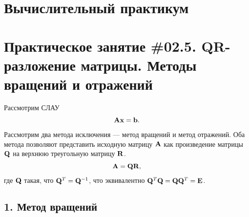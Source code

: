 \documentclass[12pt]{article}
\begin{document}
    \begin{flushright}
    \end{flushright}
    \begin{flushright}
    \end{flushright}
    \section*{Вычислительный практикум}
    \section*{Практическое занятие \#02.5. QR-разложение матрицы. Методы вращений и отражений}
	
	Рассмотрим СЛАУ
	\begin{equation}
		\bold{Ax}=\bold{b}.\label{fm0}
	\end{equation}
	Рассмотрим два метода исключения --- метод вращений и метод отражений. Оба метода позволяют представить исходную матрицу $\bold A$ как произведение матрицы $\bold Q$ на верхнюю треугольную матрицу $\bold R$.
	\begin{equation}
		\bold{A}=\bold{QR},
	\end{equation}
	где $\bold{Q}$ такая, что $\bold{Q}^{T}=\bold{Q}^{-1}$, что эквивалентно $\bold{Q}^T \bold{Q}=\bold{Q}\bold{Q}^T=\bold{E}$.
	
    \subsection*{1. Метод вращений}
\end{document}
